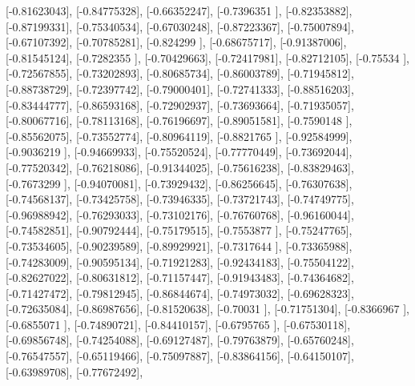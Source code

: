 \documentclass{article}
\begin{document}
       [-0.81623043],
       [-0.84775328],
       [-0.66352247],
       [-0.7396351 ],
       [-0.82353882],
       [-0.87199331],
       [-0.75340534],
       [-0.67030248],
       [-0.87223367],
       [-0.75007894],
       [-0.67107392],
       [-0.70785281],
       [-0.824299  ],
       [-0.68675717],
       [-0.91387006],
       [-0.81545124],
       [-0.7282355 ],
       [-0.70429663],
       [-0.72417981],
       [-0.82712105],
       [-0.75534   ],
       [-0.72567855],
       [-0.73202893],
       [-0.80685734],
       [-0.86003789],
       [-0.71945812],
       [-0.88738729],
       [-0.72397742],
       [-0.79000401],
       [-0.72741333],
       [-0.88516203],
       [-0.83444777],
       [-0.86593168],
       [-0.72902937],
       [-0.73693664],
       [-0.71935057],
       [-0.80067716],
       [-0.78113168],
       [-0.76196697],
       [-0.89051581],
       [-0.7590148 ],
       [-0.85562075],
       [-0.73552774],
       [-0.80964119],
       [-0.8821765 ],
       [-0.92584999],
       [-0.9036219 ],
       [-0.94669933],
       [-0.75520524],
       [-0.77770449],
       [-0.73692044],
       [-0.77520342],
       [-0.76218086],
       [-0.91344025],
       [-0.75616238],
       [-0.83829463],
       [-0.7673299 ],
       [-0.94070081],
       [-0.73929432],
       [-0.86256645],
       [-0.76307638],
       [-0.74568137],
       [-0.73425758],
       [-0.73946335],
       [-0.73721743],
       [-0.74749775],
       [-0.96988942],
       [-0.76293033],
       [-0.73102176],
       [-0.76760768],
       [-0.96160044],
       [-0.74582851],
       [-0.90792444],
       [-0.75179515],
       [-0.7553877 ],
       [-0.75247765],
       [-0.73534605],
       [-0.90239589],
       [-0.89929921],
       [-0.7317644 ],
       [-0.73365988],
       [-0.74283009],
       [-0.90595134],
       [-0.71921283],
       [-0.92434183],
       [-0.75504122],
       [-0.82627022],
       [-0.80631812],
       [-0.71157447],
       [-0.91943483],
       [-0.74364682],
       [-0.71427472],
       [-0.79812945],
       [-0.86844674],
       [-0.74973032],
       [-0.69628323],
       [-0.72635084],
       [-0.86987656],
       [-0.81520638],
       [-0.70031   ],
       [-0.71751304],
       [-0.8366967 ],
       [-0.6855071 ],
       [-0.74890721],
       [-0.84410157],
       [-0.6795765 ],
       [-0.67530118],
       [-0.69856748],
       [-0.74254088],
       [-0.69127487],
       [-0.79763879],
       [-0.65760248],
       [-0.76547557],
       [-0.65119466],
       [-0.75097887],
       [-0.83864156],
       [-0.64150107],
       [-0.63989708],
       [-0.77672492],
\end{document}
